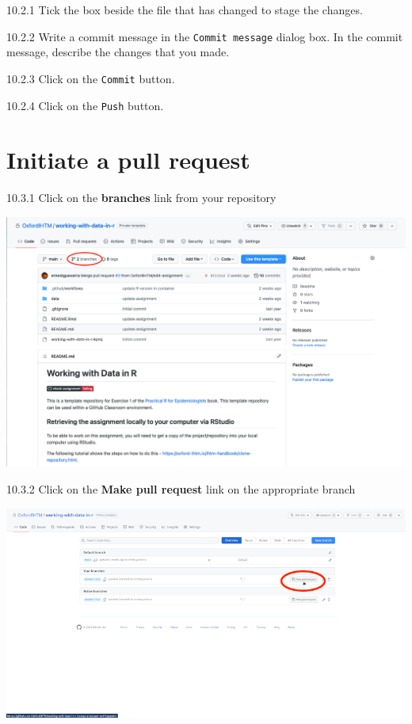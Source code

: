 \documentclass[
  12pt,
]{book}
\begin{document}
10.2.1 Tick the box beside the file that has changed to stage the changes.

10.2.2 Write a commit message in the \texttt{Commit\ message} dialog box. In the commit message, describe the changes that you made.

10.2.3 Click on the \texttt{Commit} button.

10.2.4 Click on the \texttt{Push} button.

\hypertarget{initiate-a-pull-request}{%
\section{Initiate a pull request}\label{initiate-a-pull-request}}

10.3.1 Click on the \textbf{branches} link from your repository

\includegraphics{images/pull_request1.png}

10.3.2 Click on the \textbf{Make pull request} link on the appropriate branch

\includegraphics{images/pull_request2.png}
\end{document}
